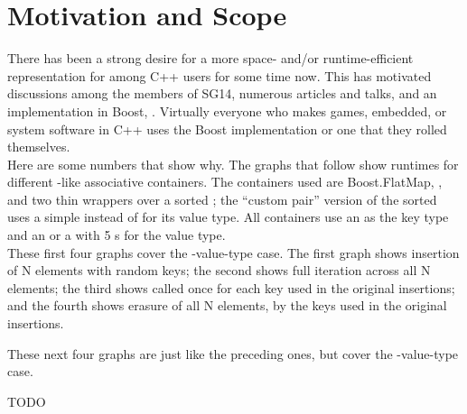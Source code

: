 \section{Motivation and Scope}

There has been a strong desire for a more space- and/or runtime-efficient
representation for  among C++ users for some time now.  This has
motivated discussions among the members of SG14, numerous articles and talks,
and an implementation in Boost, .  Virtually
everyone who makes games, embedded, or system software in C++ uses the Boost
implementation or one that they rolled themselves.\\

Here are some numbers that show why.  The graphs that follow show runtimes for
different -like associative containers.  The containers used are
Boost.FlatMap, , and two thin wrappers over a sorted
; the ``custom pair'' version of the sorted
 uses a simple  instead of  for
its value type.  All containers use an  as the key type and an
 or a  with 5 s for the value type.\\

These first four graphs cover the -value-type case.  The first graph
shows insertion of N elements with random keys; the second shows full
iteration across all N elements; the third shows 
called once for each key used in the original insertions; and the fourth shows
erasure of all N elements, by the keys used in the original insertions.


These next four graphs are just like the preceding ones, but cover the
-value-type case.


TODO
